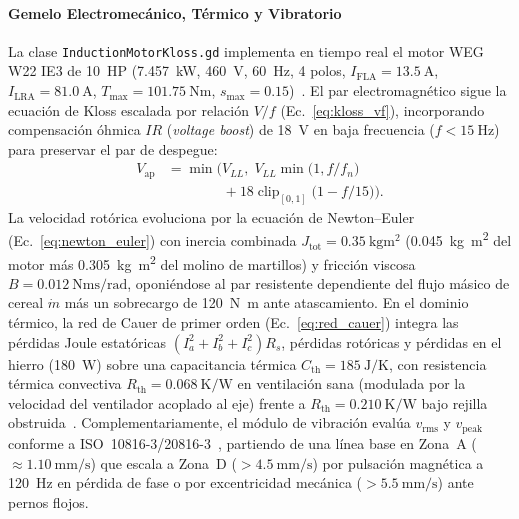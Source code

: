 \paragraph*{Gemelo Electromecánico, Térmico y Vibratorio}
La clase \texttt{Induction\allowbreak Motor\allowbreak Kloss.gd} implementa en tiempo real el motor WEG W22 IE3 de \qty{10}{HP} (\qty{7.457}{\kilo\watt}, \qty{460}{\volt}, \qty{60}{\hertz}, \num{4} polos, $I_{\text{FLA}}=\qty{13.5}{\ampere}$, $I_{\text{LRA}}=\qty{81.0}{\ampere}$, $T_{\max}=\qty{101.75}{\newton\meter}$, $s_{\max}=\num{0.15}$)~\cite{WEG2024,IEC60034}. El par electromagnético sigue la ecuación de Kloss escalada por relación $V/f$ (Ec.~\eqref{eq:kloss_vf}), incorporando compensación óhmica $IR$ (\emph{voltage boost}) de \qty{18}{\volt} en baja frecuencia ($f<\qty{15}{\hertz}$) para preservar el par de despegue:
\begin{equation}
\begin{split}
V_{\text{ap}} &= \min\!\Big(V_{LL},\; V_{LL}\min\!\big(1, f/f_n\big) \\
&\qquad\qquad + 18\operatorname{clip}_{[0,1]}\!\big(1 - f/15\big)\Big).
\end{split}
\label{eq:godot_vf_ir}
\end{equation}
La velocidad rotórica evoluciona por la ecuación de Newton--Euler (Ec.~\eqref{eq:newton_euler}) con inercia combinada $J_{\text{tot}}=\qty{0.35}{\kilogram\meter\squared}$ (\qty{0.045}{\kilogram\meter\squared} del motor más \qty{0.305}{\kilogram\meter\squared} del molino de martillos) y fricción viscosa $B=\qty{0.012}{\newton\meter\second\per\radian}$, oponiéndose al par resistente dependiente del flujo másico de cereal $\dot{m}$ más un sobrecargo de \qty{120}{\newton\meter} ante atascamiento. En el dominio térmico, la red de Cauer de primer orden (Ec.~\eqref{eq:red_cauer}) integra las pérdidas Joule estatóricas $(I_a^2+I_b^2+I_c^2)R_s$, pérdidas rotóricas y pérdidas en el hierro (\qty{180}{\watt}) sobre una capacitancia térmica $C_{\text{th}}=\qty{185}{\joule\per\kelvin}$, con resistencia térmica convectiva $R_{\text{th}}=\qty{0.068}{\kelvin\per\watt}$ en ventilación sana (modulada por la velocidad del ventilador acoplado al eje) frente a $R_{\text{th}}=\qty{0.210}{\kelvin\per\watt}$ bajo rejilla obstruida~\cite{Thermal2025,Chapman2012}. Complementariamente, el módulo de vibración evalúa $v_{\text{rms}}$ y $v_{\text{peak}}$ conforme a ISO~10816-3/20816-3~\cite{ISO10816,ISO20816}, partiendo de una línea base en Zona~A ($\approx\qty{1.10}{\milli\meter\per\second}$) que escala a Zona~D ($>\qty{4.5}{\milli\meter\per\second}$) por pulsación magnética a \qty{120}{\hertz} en pérdida de fase o por excentricidad mecánica ($>\qty{5.5}{\milli\meter\per\second}$) ante pernos flojos.

